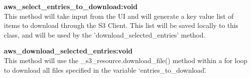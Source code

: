 \textbf{aws\_select\_entries\_to\_download:void} \\
    This method will take input from the UI and will generate a key value list of items to download through the S3 Client. This list will be saved locally to this class,
    and will be used by the 'download\_selected\_entries' method.

\textbf{aws\_download\_selected\_entries:void} \\
    This method will use the \_s3\_resource.download\_file() method within a for loop to download all files specified in the variable `entries\_to\_download\'.

